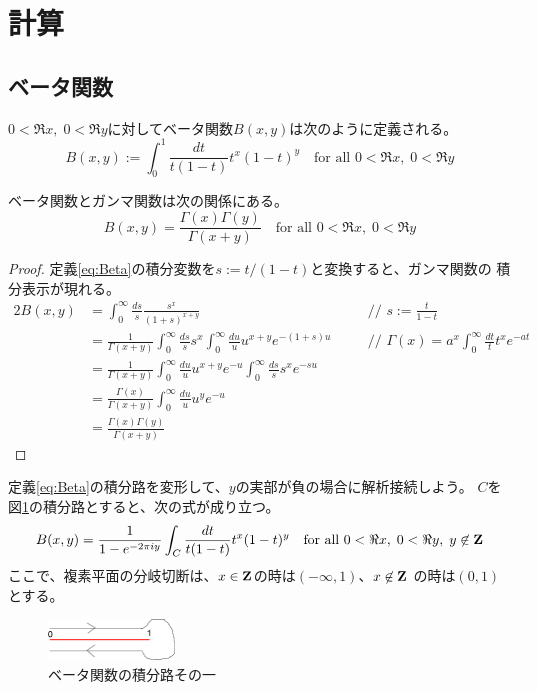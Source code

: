 \section{計算}\label{s1:計算} %
\subsection{ベータ関数}\label{s2:ベータ関数} %
$0<\Re x,\; 0<\Re y$に対してベータ関数$B(x,y)$は次のように定義される。
\begin{equation}\label{eq:Beta}
	B(x, y) := \int_0^1 \frac{dt}{t(1-t)}t^x(1-t)^y
	\quad\text{for all } 0<\Re x,\; 0<\Re y
\end{equation}

ベータ関数とガンマ関数は次の関係にある。
\begin{equation}
	B(x, y) = \frac{\Gamma(x)\Gamma(y)}{\Gamma(x+y)}
	\quad\text{for all } 0<\Re x,\; 0<\Re y
\end{equation}
\begin{proof} %
	定義\eqref{eq:Beta}の積分変数を$s:=t/(1-t)$と変換すると、ガンマ関数の
	積分表示が現れる。
	\begin{alignat*}{2}
		B(x, y) &= \int_0^\infty\frac{ds}{s}\frac{s^x}{(1+s)^{x+y}}
		&\quad&\text{// } s := \frac{t}{1-t} \\
		&= \frac{1}{\Gamma(x+y)}\int_0^\infty\frac{ds}{s}s^x
		\int_0^\infty\frac{du}{u}u^{x+y}e^{-(1+s)u}
		&\quad&\text{// } \Gamma(x) = a^x\int_0^\infty\frac{dt}{t}t^xe^{-at} \\
		&= \frac{1}{\Gamma(x+y)}\int_0^\infty\frac{du}{u}u^{x+y}e^{-u}
		\int_0^\infty\frac{ds}{s}s^xe^{-su} \\
		&= \frac{\Gamma(x)}{\Gamma(x+y)}\int_0^\infty\frac{du}{u}u^ye^{-u} \\
		&= \frac{\Gamma(x)\Gamma(y)}{\Gamma(x+y)}
	\end{alignat*}
\end{proof} %

定義\eqref{eq:Beta}の積分路を変形して、$y$の実部が負の場合に解析接続しよう。
$C$を図\ref{fig:ベータ関数の積分路その一}の積分路とすると、次の式が成り立つ。
\begin{equation*}
	B(x,y) = \frac{1}{1 - e^{-2\pi iy}}\int_C \frac{dt}{t(1 - t)}t^x(1 - t)^y
	\quad\text{for all } 0 < \Re x,\; 0 < \Re y,\; y\not\in\mathbf{Z}
\end{equation*}
ここで、複素平面の分岐切断は、$x\in\mathbf{Z}$の時は$(-\infty,1)$、$x\not\in\mathbf{Z}$
の時は$(0,1)$とする。

\begin{figure}[htbp] %
	\begin{center}
		\includegraphics[width=0.3\textwidth]{fig/contour-2.eps}
	\end{center}
	\caption{ベータ関数の積分路その一}\label{fig:ベータ関数の積分路その一}
\end{figure} %
